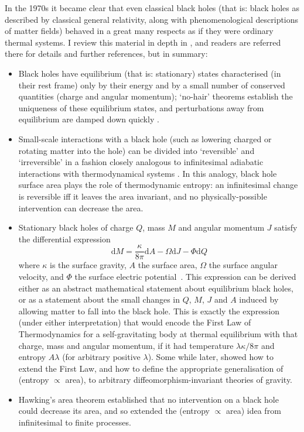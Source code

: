 \documentclass{article}
\newcommand{\be}{\begin{equation}}
\newcommand{\ee}{\end{equation}}
\begin{document}
In the 1970s it became clear that even classical black holes (that is: black holes as described by classical general relativity, along with phenomenological descriptions of matter fields) behaved in a great many respects as if they were ordinary thermal systems. I review this material in depth in , and readers are referred there for details and further references, but in summary:
\begin{itemize}
\item Black holes have equilibrium (that is: stationary) states characterised (in their rest frame) only by their energy and by a small number of conserved quantities (charge and angular momentum); `no-hair' theorems \cite{carter1979} establish the uniqueness of these equilibrium states, and perturbations away from equilibrium are damped down quickly \cite[chs.VI-VII]{membraneparadigm}.
\item Small-scale interactions with a black hole (such as lowering charged or rotating matter into the hole) can be divided into `reversible' and `irreversible' in a fashion closely analogous to infinitesimal adiabatic interactions with thermodynamical systems \cite{christodolouruffini}. In this analogy, black hole surface area plays the role of thermodynamic entropy: an infinitesimal change is reversible iff it leaves the area invariant, and no physically-possible intervention can decrease the area. 
\item Stationary black holes of charge $Q$, mass $M$ and angular momentum $J$ satisfy the differential expression 
\be
\mathrm{d}M = \frac{\kappa}{8\pi} \mathrm{d}A - \Omega \mathrm{d}J - \Phi \mathrm{d}Q 
\ee
where $\kappa$ is the surface gravity, $A$ the surface area, $\Omega$ the surface angular velocity, and $\Phi$ the surface electric potential~\cite{bardeenlaws}. This expression can be derived either as an abstract mathematical statement about equilibrium black holes, or as a statement about the small changes in $Q$, $M$, $J$ and $A$ induced by allowing matter to fall into the black hole. This is exactly the expression (under either interpretation) that would encode the First Law of Thermodynamics for a self-gravitating body at thermal equilibrium with that charge, mass and angular momentum, if it had temperature $\lambda \kappa/8\pi$ and entropy $A \lambda$ (for arbitrary positive $\lambda$). Some while later,  showed how to extend the First Law, and how to define the appropriate generalisation of (entropy $\propto$ area), to arbitrary diffeomorphism-invariant theories of gravity.
\item Hawking's area theorem \cite{hawkingareatheorem} established that no intervention on a black hole could decrease its area, and so extended the (entropy $\propto$ area) idea from infinitesimal to finite processes.
\end{itemize}
\end{document}
